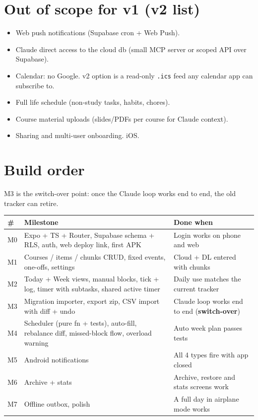 \documentclass[11pt,a4paper]{article}
\newcommand{\code}[1]{\texttt{\small #1}}
\begin{document}
\section{Out of scope for v1 (v2 list)}

\begin{itemize}
  \item Web push notifications (Supabase cron + Web Push).
  \item Claude direct access to the cloud db (small MCP server or scoped API over Supabase).
  \item Calendar: no Google. v2 option is a read-only \code{.ics} feed any calendar app can subscribe to.
  \item Full life schedule (non-study tasks, habits, chores).
  \item Course material uploads (slides/PDFs per course for Claude context).
  \item Sharing and multi-user onboarding. iOS.
\end{itemize}

\section{Build order}

M3 is the switch-over point: once the Claude loop works end to end, the old tracker can retire.

\begin{longtable}{L{1cm}L{8.3cm}L{5.9cm}}
\toprule
\textbf{\#} & \textbf{Milestone} & \textbf{Done when} \\
\midrule
\endhead
M0 & Expo + TS + Router, Supabase schema + RLS, auth, web deploy link, first APK & Login works on phone and web \\
M1 & Courses / items / chunks CRUD, fixed events, one-offs, settings & Cloud + DL entered with chunks \\
M2 & Today + Week views, manual blocks, tick + log, timer with subtasks, shared active timer & Daily use matches the current tracker \\
M3 & Migration importer, export zip, CSV import with diff + undo & Claude loop works end to end (\textbf{switch-over}) \\
M4 & Scheduler (pure fn + tests), auto-fill, rebalance diff, missed-block flow, overload warning & Auto week plan passes tests \\
M5 & Android notifications & All 4 types fire with app closed \\
M6 & Archive + stats & Archive, restore and stats screens work \\
M7 & Offline outbox, polish & A full day in airplane mode works \\
\bottomrule
\end{longtable}
\end{document}
